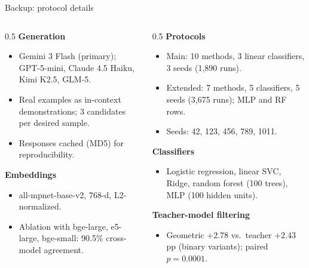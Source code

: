 \begin{frame}{Backup: protocol details}
\begin{columns}[T]
\begin{column}{0.5\textwidth}
\footnotesize
\textbf{Generation}
\begin{itemize}\setlength\itemsep{0pt}\scriptsize
  \item Gemini 3 Flash (primary); GPT-5-mini, Claude 4.5 Haiku, Kimi K2.5, GLM-5.
  \item Real examples as in-context demonstrations; 3 candidates per desired sample.
  \item Responses cached (MD5) for reproducibility.
\end{itemize}

\textbf{Embeddings}
\begin{itemize}\setlength\itemsep{0pt}\scriptsize
  \item all-mpnet-base-v2, 768-d, L2-normalized.
  \item Ablation with bge-large, e5-large, bge-small: 90.5\% cross-model agreement.
\end{itemize}
\end{column}
\begin{column}{0.5\textwidth}
\footnotesize
\textbf{Protocols}
\begin{itemize}\setlength\itemsep{0pt}\scriptsize
  \item Main: 10 methods, 3 linear classifiers, 3 seeds (1,890 runs).
  \item Extended: 7 methods, 5 classifiers, 5 seeds (3,675 runs); MLP and RF rows.
  \item Seeds: 42, 123, 456, 789, 1011.
\end{itemize}

\textbf{Classifiers}
\begin{itemize}\setlength\itemsep{0pt}\scriptsize
  \item Logistic regression, linear SVC, Ridge, random forest (100 trees), MLP (100 hidden units).
\end{itemize}

\textbf{Teacher-model filtering}
\begin{itemize}\setlength\itemsep{0pt}\scriptsize
  \item Geometric $+2.78$ vs.\ teacher $+2.43$ pp (binary variants); paired $p=0.0001$.
\end{itemize}
\end{column}
\end{columns}
\end{frame}
